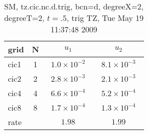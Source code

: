 \begin{table}[hbt]\tableFont %
\begin{center}
\begin{tabular}{|l|c|c|c|} \hline\hline 
grid  & N &  $u_1$ & $u_2$  \\ \hline 
                cic1 &     1 & ~$1.0\times10^{ -2}$~ & ~$8.1\times10^{ -3}$~  \\ \hline
                cic2 &     2 & ~$2.8\times10^{ -3}$~ & ~$2.1\times10^{ -3}$~  \\ \hline
                cic4 &     4 & ~$6.6\times10^{ -4}$~ & ~$5.2\times10^{ -4}$~  \\ \hline
                cic8 &     8 & ~$1.7\times10^{ -4}$~ & ~$1.3\times10^{ -4}$~  \\ \hline
    rate             &       &       $1.98$          &       $1.99$           \\ \hline\hline
\end{tabular}
\caption{SM, tz.cic.nc.d.trig, bcn=d, degreeX=2, degreeT=2, $t=.5$, trig TZ, Tue May 19 11:37:48 2009}\label{table:tz.cic.nc.d.trig}
\end{center}
\end{table}
